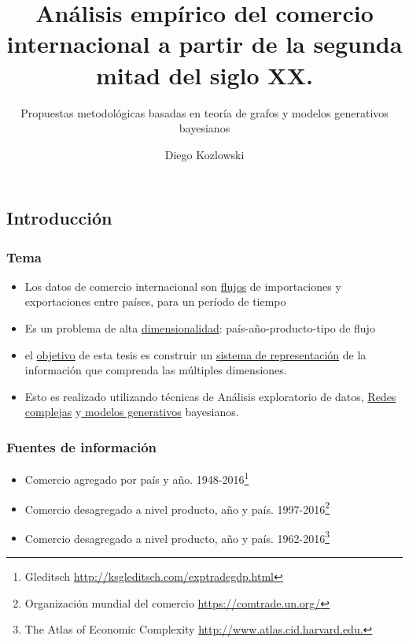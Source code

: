 \documentclass[compress]{beamer}
\title[Defensa de Tesis]{Análisis empírico del comercio internacional a partir de la segunda mitad del siglo XX.}
\subtitle{Propuestas metodológicas basadas en teoría de grafos y modelos generativos
	bayesianos}
\author{Diego Kozlowski}
\institute[Universidad de Buenos Aires]
{
	Universidad de Buenos Aires\\ 
	
	\textit{Master en Data Mining \& Knowledge Discovery} \\
	\medskip
	\textit{Supervisor: Viktoriya Semeshenko}
}
\date{}
\begin{document}
\begin{frame}

\titlepage 

\end{frame}



\begin{frame}

\section{Introducción}


\frametitle{Tema}

\begin{itemize}
	
	\item[\faRebel] Los datos de comercio internacional son \underline{flujos} de importaciones y exportaciones entre países, para un período de tiempo 
	\item[\faRebel] Es un problema de alta \underline{dimensionalidad}: país-año-producto-tipo de flujo
	\item[\faRebel] el \underline{objetivo} de esta tesis es construir un \underline{sistema de representación} de la información que comprenda las múltiples dimensiones.
	\item[\faRebel] Esto es realizado utilizando técnicas de Análisis exploratorio de datos, \underline{Redes complejas} y\underline{ modelos generativos} bayesianos. 
\end{itemize}

\end{frame}


\begin{frame}
\frametitle{Fuentes de información}

\begin{itemize}
	
	\item[\faRebel] Comercio agregado por país y año. 1948-2016\footnote{Gleditsch \url{http://ksgleditsch.com/exptradegdp.html}}  
	\item[\faRebel] Comercio desagregado a nivel producto, año y país. 1997-2016\footnote{Organización mundial del comercio \url{https://comtrade.un.org/}}
	\item[\faRebel] Comercio desagregado a nivel producto, año y país. 1962-2016\footnote{The Atlas of Economic Complexity \url{http://www.atlas.cid.harvard.edu.}}	
\end{itemize}

\end{frame}
\end{document}
